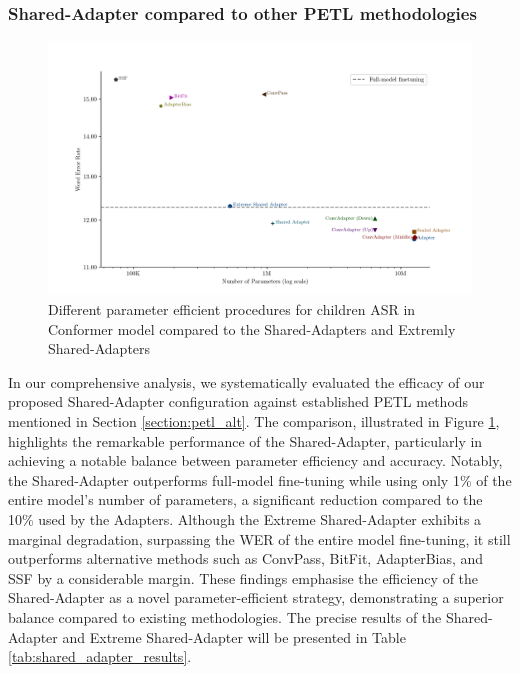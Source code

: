 \subsubsection{Shared-Adapter compared to other PETL methodologies}
\begin{figure}[t]
    \begin{center}
        \includegraphics[width=\textwidth]{imgs/Adapters_compare.png}
        \caption{Different parameter efficient procedures for children ASR in Conformer model compared to the Shared-Adapters and Extremly Shared-Adapters}
        \label{fig:adapter_compared}
    \end{center}
\end{figure}


In our comprehensive analysis, we systematically evaluated the efficacy of our proposed Shared-Adapter configuration against established \ac{PETL} methods mentioned in Section \ref{section:petl_alt}. The comparison, illustrated in Figure \ref{fig:adapter_compared}, highlights the remarkable performance of the Shared-Adapter, particularly in achieving a notable balance between parameter efficiency and accuracy. Notably, the Shared-Adapter outperforms full-model fine-tuning while using only 1\% of the entire model's number of parameters, a significant reduction compared to the 10\% used by the Adapters. Although the Extreme Shared-Adapter exhibits a marginal degradation, surpassing the \ac{WER} of the entire model fine-tuning, it still outperforms alternative methods such as ConvPass, BitFit, AdapterBias, and \ac{SSF} by a considerable margin. These findings emphasise the efficiency of the Shared-Adapter as a novel parameter-efficient strategy, demonstrating a superior balance compared to existing methodologies. The precise results of the Shared-Adapter and Extreme Shared-Adapter will be presented in Table \ref{tab:shared_adapter_results}.

